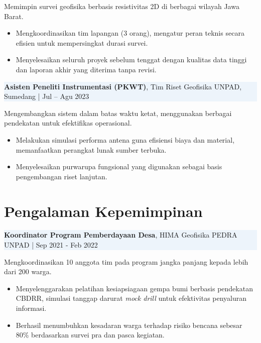 \documentclass[10pt,a4paper]{article}
\begin{document}
Memimpin survei geofisika berbasis resistivitas 2D di berbagai wilayah Jawa Barat.

\begin{itemize}[left=1.5em, noitemsep, topsep=0pt]
  \item Mengkoordinasikan tim lapangan (3 orang), mengatur peran teknis secara efisien untuk mempersingkat durasi survei.
  \item Menyelesaikan seluruh proyek sebelum tenggat dengan kualitas data tinggi dan laporan akhir yang diterima tanpa revisi.
\end{itemize}

\setlength{\fboxsep}{0pt}
\colorbox[HTML]{EDF4FB}{%
  \parbox{\linewidth}{%
    \textbf{Asisten Peneliti Instrumentasi (PKWT)}, Tim Riset Geofisika UNPAD, Sumedang \quad | \quad Jul – Agu 2023
  }%
}

Mengembangkan sistem dalam batas waktu ketat, menggunakan berbagai pendekatan untuk efektifikas operasional.

\begin{itemize}[left=1.5em, noitemsep, topsep=0pt]
  \item Melakukan simulasi performa antena guna efisiensi biaya dan material, memanfaatkan perangkat lunak sumber terbuka.
  \item Menyelesaikan purwarupa fungsional yang digunakan sebagai basis pengembangan riset lanjutan.
\end{itemize}

\section*{Pengalaman Kepemimpinan}
\noindent
\setlength{\fboxsep}{0pt}%
\colorbox[HTML]{EDF4FB}{%
  \parbox{\linewidth}{%
    \textbf{Koordinator Program Pemberdayaan Desa}, HIMA Geofisika PEDRA UNPAD \quad | \quad Sep 2021 - Feb 2022%
  }%
}

Mengkoordinasikan 10 anggota tim pada program jangka panjang kepada lebih dari 200 warga.

\begin{itemize}[left=1.5em, noitemsep, topsep=0pt]
  \item Menyelenggarakan pelatihan kesiapsiagaan gempa bumi berbasis pendekatan CBDRR, simulasi tanggap darurat \textit{mock drill} untuk efektivitas penyaluran informasi.
  \item Berhasil menumbuhkan kesadaran warga terhadap risiko bencana sebesar 80\% berdasarkan survei pra dan pasca kegiatan.
\end{itemize}
\end{document}
